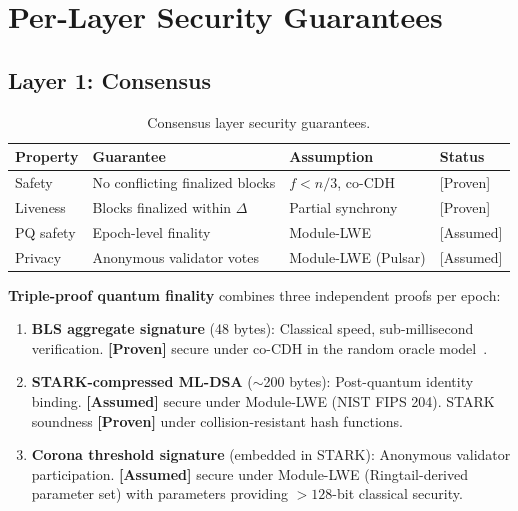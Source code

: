 \section{Per-Layer Security Guarantees}

\label{sec:layers}

\subsection{Layer 1: Consensus}

\begin{table}[ht]
\centering
\caption{Consensus layer security guarantees.}
\label{tab:consensus-security}
\begin{tabular}{llll}
\toprule
\textbf{Property} & \textbf{Guarantee} & \textbf{Assumption} & \textbf{Status} \\
\midrule
Safety & No conflicting finalized blocks & $f < n/3$, co-CDH & [Proven] \\
Liveness & Blocks finalized within $\Delta$ & Partial synchrony & [Proven] \\
PQ safety & Epoch-level finality & Module-LWE & [Assumed] \\
Privacy & Anonymous validator votes & Module-LWE (Pulsar) & [Assumed] \\
\bottomrule
\end{tabular}
\end{table}

\textbf{Triple-proof quantum finality} combines three independent proofs per epoch:

\begin{enumerate}[leftmargin=2em]
  \item \textbf{BLS aggregate signature} (48 bytes): Classical speed, sub-millisecond
        verification. \textbf{[Proven]} secure under co-CDH in the random oracle
        model~\cite{boneh2001bls}.
  \item \textbf{STARK-compressed ML-DSA} ($\sim$200 bytes): Post-quantum identity
        binding. \textbf{[Assumed]} secure under Module-LWE (NIST FIPS 204). STARK
        soundness \textbf{[Proven]} under collision-resistant hash functions.
  \item \textbf{Corona threshold signature} (embedded in STARK): Anonymous
        validator participation. \textbf{[Assumed]} secure under Module-LWE
        (Ringtail-derived parameter set) with
        parameters providing $> 128$-bit classical security.
\end{enumerate}

